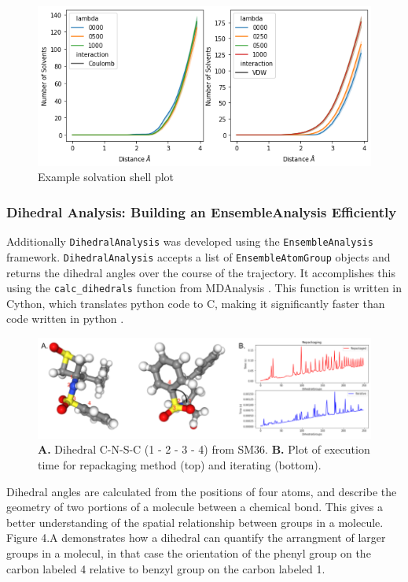 \documentclass{article}[letterpaper, margins=1in, 12pt]
\begin{document}
\begin{figure}[h]
    \centering
	\includegraphics[scale=0.5]{solv_plot}
	\caption{Example solvation shell plot}
	\label{fig:solvation}
\end{figure}
 

\subsubsection{Dihedral Analysis: Building an EnsembleAnalysis Efficiently}

Additionally \texttt{DihedralAnalysis} was developed using the \texttt{EnsembleAnalysis} framework. \texttt{DihedralAnalysis} accepts a list of \texttt{EnsembleAtomGroup} objects and returns the dihedral angles over the course of the trajectory. It accomplishes this using the \lstinline{calc_dihedrals} function from MDAnalysis \cite{michaud-agrawal_mdanalysis_2011, gowers_mdanalysis_2016}. This function is written in Cython, which translates python code to C, making it significantly faster than code written in python \cite{Mull2018}. 

\begin{figure}[h]
    \centering
	\includegraphics[scale=0.5]{Dihedral}
	\caption{\textbf{A.} Dihedral C-N-S-C (1 - 2 - 3 - 4) from SM36. \textbf{B.} Plot of execution time for repackaging method (top) and iterating (bottom).} 
	\label{fig:dihedral}
\end{figure}

Dihedral angles are calculated from the positions of four atoms, and describe the geometry of two portions of a molecule between a chemical bond. This gives a better understanding of the spatial relationship between groups in a molecule. Figure 4.A demonstrates how a dihedral can quantify the arrangment of larger groups in a molecul, in that case the orientation of the phenyl group on the carbon labeled 4 relative to benzyl group on the carbon labeled 1. 
\end{document}
